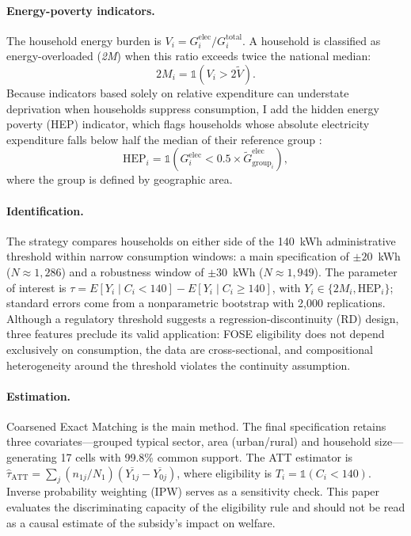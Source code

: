 \documentclass[11pt,a4paper]{article}
\begin{document}
\paragraph{Energy-poverty indicators.} The household energy burden is
$V_i = G^{\text{elec}}_i / G^{\text{total}}_i$. A household is classified as
energy-overloaded (\textit{2M}) when this ratio exceeds twice the national
median:
\begin{equation}
2M_i = \mathbb{1}\!\left(V_i > 2\widetilde{V}\right).
\end{equation}
Because indicators based solely on relative expenditure can understate
deprivation when households suppress consumption, I add the hidden energy
poverty (HEP) indicator, which flags households whose absolute electricity
expenditure falls below half the median of their reference group
\citep{thomson2016}:
\begin{equation}
\text{HEP}_i = \mathbb{1}\!\left(G^{\text{elec}}_i <
0.5 \times \widetilde{G}^{\text{elec}}_{\text{group}_i}\right),
\end{equation}
where the group is defined by geographic area.

\paragraph{Identification.} The strategy compares households on either side of
the 140~kWh administrative threshold within narrow consumption windows: a main
specification of $\pm20$~kWh ($N\approx1{,}286$) and a robustness window of
$\pm30$~kWh ($N\approx1{,}949$). The parameter of interest is
$\tau = E[Y_i \mid C_i < 140] - E[Y_i \mid C_i \geq 140]$, with
$Y_i \in \{2M_i, \text{HEP}_i\}$; standard errors come from a nonparametric
bootstrap with 2{,}000 replications. Although a regulatory threshold suggests a
regression-discontinuity (RD) design, three features preclude its valid
application: FOSE eligibility does not depend exclusively on consumption, the
data are cross-sectional, and compositional heterogeneity around the threshold
violates the continuity assumption.

\paragraph{Estimation.} Coarsened Exact Matching \citep[CEM,][]{iacus2012} is
the main method. The final specification retains three covariates---grouped
typical sector, area (urban/rural) and household size---generating 17 cells
with 99.8\% common support. The ATT estimator is
$\widehat{\tau}_{\text{ATT}} = \sum_j (n_{1j}/N_1)(\overline{Y_{1j}}-\overline{Y_{0j}})$,
where eligibility is $T_i = \mathbb{1}(C_i<140)$. Inverse probability weighting
(IPW) serves as a sensitivity check. This paper evaluates the discriminating
capacity of the eligibility rule and should not be read as a causal estimate of
the subsidy's impact on welfare.
\end{document}
